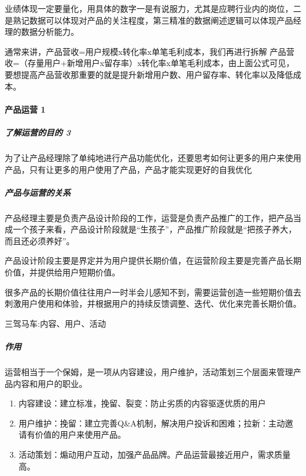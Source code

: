 \documentclass[letterpaper,11pt,english]{sphinxmanual}
\begin{document}
业绩体现一定要量化，用具体的数字一是有说服力，尤其是应聘行业内的岗位，二是熟记数据可以体现对产品的关注程度，第三精准的数据阐述逻辑可以体现产品经理的数据分析能力。

通常来讲，产品营收=用户规模x转化率x单笔毛利\sphinxhyphen{}成本，我们再进行拆解
产品营收=（存量用户+新增用户x留存率）x转化率x单笔毛利\sphinxhyphen{}成本，由上面公式可见，要想提高产品营收那重要的就是提升新增用户数、用户留存率、转化率以及降低成本。


\paragraph{产品运营 1\sphinxfootnotemark[393]}
\label{\detokenize{chapter_idea/GTM:yunying}}\label{\detokenize{chapter_idea/GTM:id2}}%
\begin{footnotetext}[393]\sphinxAtStartFootnote
{}
%
\end{footnotetext}\ignorespaces 

\subparagraph{了解运营的目的 3\sphinxfootnotemark[394]}
\label{\detokenize{chapter_idea/GTM:id3}}%
\begin{footnotetext}[394]\sphinxAtStartFootnote
{}
%
\end{footnotetext}\ignorespaces 
为了让产品经理除了单纯地进行产品功能优化，还要思考如何让更多的用户来使用产品，只有让更多的用户使用了产品，产品才能实现更好的自我优化


\subparagraph{产品与运营的关系}
\label{\detokenize{chapter_idea/GTM:id4}}
产品经理主要是负责产品设计阶段的工作，运营是负责产品推广的工作，把产品当成一个孩子来看，产品设计阶段就是“生孩子”，产品推广阶段就是“把孩子养大，而且还必须养好”。

产品设计阶段主要是界定并为用户提供长期价值，在运营阶段主要是完善产品长期价值，并提供给用户短期价值。

很多产品的长期价值往往用户一时半会儿感知不到，需要运营创造一些短期价值去刺激用户使用和体验，并根据用户的持续反馈调整、迭代、优化来完善长期价值。

三驾马车:内容、用户、活动


\subparagraph{作用}
\label{\detokenize{chapter_idea/GTM:id5}}
运营相当于一个保姆，是一项从内容建设，用户维护，活动策划三个层面来管理产品内容和用户的职业。
\begin{enumerate}
%
\item {} 
内容建设：建立标准，挽留、裂变：防止劣质的内容驱逐优质的用户

\item {} 
用户维护：挽留：建立完善Q\&A机制，解决用户投诉和困难；拉新：主动邀请有价值的用户来使用产品。

\item {} 
活动策划：煽动用户互动，加强产品品牌。产品运营最接近用户，需求质量高。

\end{enumerate}
\end{document}
